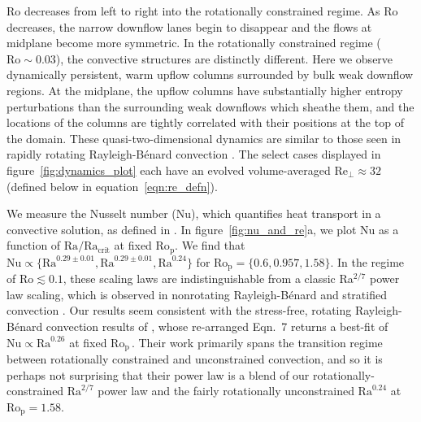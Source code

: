 \documentclass[twocolumn, amsmath, amsfonts, amssymb, trackchanges]{aastex62}
\newcommand{\RB}{Rayleigh-B\'{e}nard }
\newcommand{\pro}{\ensuremath{\text{Ro}_{\text{p}}}}
\begin{document}
Ro decreases from left to right into the rotationally constrained 
regime. As Ro decreases, the narrow downflow lanes begin to disappear
and the flows at midplane become more symmetric. In the rotationally constrained regime ($\text{Ro} \sim 0.03$), 
the convective structures are distinctly different. 
Here we observe dynamically persistent, warm upflow columns 
surrounded by bulk weak downflow regions. At the midplane, the upflow columns have substantially
higher entropy perturbations than the surrounding weak downflows which sheathe them, 
and the locations of the columns
are tightly correlated with their positions at the top of the domain. These quasi-two-dimensional 
dynamics are similar to those seen in rapidly 
rotating \RB convection \citep[e.g.,][]{stellmach&all2014}. 
The select cases displayed in figure~\ref{fig:dynamics_plot} each have an evolved volume-averaged
$\text{Re}_{\perp} \approx 32$ (defined below in equation~\ref{eqn:re_defn}).

We measure the Nusselt number (Nu), which quantifies heat transport in a convective
solution, as defined in \AB.
In figure~\ref{fig:nu_and_re}a, we plot Nu as a function
of $\text{Ra}/\text{Ra}_\text{crit}$ at fixed \pro. We find that $\text{Nu} \propto \{\text{Ra}^{0.29 \pm 0.01}, \text{Ra}^{0.29 \pm 0.01}, \text{Ra}^{0.24}\}$
for $\pro = \{0.6, 0.957, 1.58\}$. In the regime of $\text{Ro} \lesssim 0.1$, these scaling laws are indistinguishable
from a classic Ra$^{2/7}$ power law scaling,
which is observed in nonrotating \RB and stratified convection \citep[][\AB]{ahlers&all2009}.
Our results seem consistent with the stress-free, rotating \RB convection results of
\cite{schmitz&tilgner2009}, whose re-arranged Eqn.~7 returns a best-fit of
$\text{Nu} \propto \text{Ra}^{0.26}$ at fixed \pro$\,$. Their work primarily spans the transition
regime between rotationally constrained and unconstrained convection, and so it is perhaps not
surprising that their power law is a blend of our rotationally-constrained $\text{Ra}^{2/7}$ power
law and the fairly rotationally unconstrained $\text{Ra}^{0.24}$ at $\pro = 1.58$.
\end{document}
